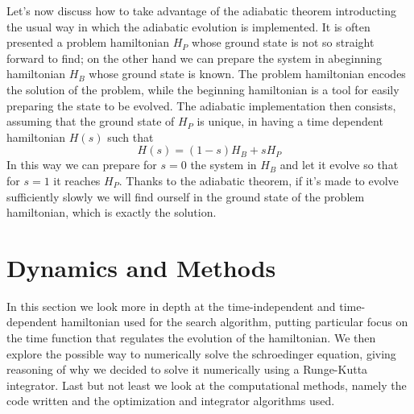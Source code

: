 \documentclass[aps,pra,reprint, onecolumn, showkeys]{revtex4-2}
\begin{document}
Let's now discuss how to take advantage of the adiabatic theorem introducting the usual way in which the adiabatic evolution is implemented. It is often presented a problem hamiltonian $H_P$ whose ground state is not so straight forward to find; on the other hand we can prepare the system in abeginning hamiltonian $H_B$ whose ground state is known. The problem hamiltonian encodes the solution of the problem, while the beginning hamiltonian is a tool for easily preparing the state to be evolved. The adiabatic implementation then consists, assuming that the ground state of $H_P$ is unique, in having a time dependent hamiltonian $H(s)$ such that
\begin{equation}
	H(s) = (1-s)H_B + s H_P
\end{equation}
In this way we can prepare for $s=0$ the system in $H_B$ and let it evolve so that for $s=1$ it reaches $H_P$. Thanks to the adiabatic theorem, if it's made to evolve sufficiently slowly we will find ourself in the ground state of the problem hamiltonian, which is exactly the solution.


\section{Dynamics and Methods}
In this section we look more in depth at the time-independent and time-dependent hamiltonian used for the search algorithm, putting particular focus on the time function that regulates the evolution of the hamiltonian. We then explore the possible way to numerically solve the schroedinger equation, giving reasoning of why we decided to solve it numerically using a Runge-Kutta integrator. Last but not least we look at the computational methods, namely the code written and the optimization and integrator algorithms used.
\end{document}
